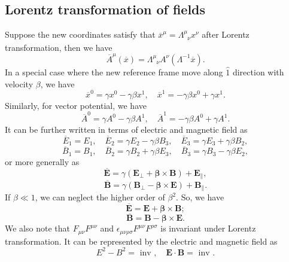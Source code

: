 \subsection{Lorentz transformation of fields}
Suppose the new coordinates satisfy that $\overline{x}^{\mu} = \Lambda^{\mu}_{\phantom{\mu}\nu}x^{\nu}$ after Lorentz transformation, then we have
\[\overline{A}^{\mu}(\overline{x}) = \Lambda^{\mu}_{\phantom{\mu}\nu}A^{\nu}(\Lambda^{-1}\overline{x}).\]
In a special case where the new reference frame move along $\hat{1}$ direction with velocity $\beta$, we have
\[\overline{x}^{0} = \gamma x^0 - \gamma \beta x^1 , \quad \overline{x}^{1} = -\gamma \beta x^0 + \gamma x^1.\]
Similarly, for vector potential, we have 
\[\overline{A}^{0} = \gamma A^0 - \gamma \beta A^1 , \quad \overline{A}^{1} = -\gamma \beta A^0 + \gamma A^1.\]
It can be further written in terms of electric and magnetic field as
\[\overline{E}_1 = E_1 , \quad \overline{E}_2 = \gamma E_2 - \gamma \beta B_3 , \quad \overline{E}_3 = \gamma E_3 + \gamma \beta B_2,\]
\[\overline{B}_1 = B_1 , \quad \overline{B}_2 = \gamma B_2 + \gamma \beta E_3 , \quad \overline{B}_3 = \gamma B_3 - \gamma \beta E_2,\]
or more generally as
\[\bm{\overline{E}} = \gamma(\bm{E}_{\perp} + \bm{\beta} \times \bm{B}) + \bm{E}_{\parallel},\]
\[\bm{\overline{B}} = \gamma(\bm{B}_{\perp} - \bm{\beta} \times \bm{E}) + \bm{B}_{\parallel}.\]
If $\beta \ll 1$, we can neglect the higher order of $\beta^2$. So, we have
\[\bm{\overline{E}} = \bm{E} + \bm{\beta} \times \bm{B};\]
\[\bm{\overline{B}} = \bm{B} - \bm{\beta} \times \bm{E}.\]
We also note that $F_{\mu\nu}F^{\mu\nu}$ and $\epsilon_{\mu\nu\rho\sigma}F^{\mu\nu}F^{\rho\sigma}$ is invariant under Lorentz transformation. It can be represented by the electric and magnetic field as
\[E^2 - B^2 = \mbox{ inv } , \quad \bm{E} \cdot \bm{B} = \mbox{ inv }.\]

